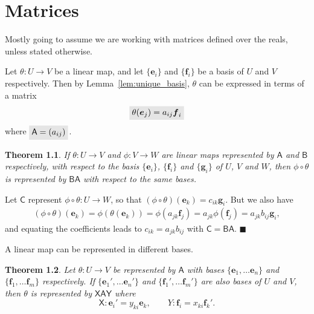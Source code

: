 \documentclass[letter-paper]{tufte-book}
\newtheorem{theorem}{\color{pastel-blue}Theorem}[section]
\newenvironment{proof}[1][Proof]{\begin{trivlist}
\item[\hskip \labelsep {\bfseries #1}]}{\end{trivlist}}
\newcommand{\As}{{\mathsf{A}}}
\newcommand{\Bs}{{\mathsf{B}}}
\newcommand{\Cs}{{\mathsf{C}}}
\newcommand{\Xs}{{\mathsf{X}}}
\newcommand{\Ys}{{\mathsf{Y}}}
\newcommand{\eb}{{\boldsymbol{e}}}
\newcommand{\fb}{{\boldsymbol{f}}}
\newcommand{\qed}{\hfill$\blacksquare$}
\newcommand{\highlight}[1]{\mathchoice%
  {\colorbox{black!10}{$\displaystyle#1$}}%
  {\colorbox{black!10}{$\textstyle#1$}}%
  {\colorbox{black!10}{$\scriptstyle#1$}}%
  {\colorbox{black!10}{$\scriptscriptstyle#1$}}}%
\begin{document}

\chapter{Matrices}

Mostly going to assume we are working with matrices defined over the reals,
unless stated otherwise.

Let $\theta: U \to V$ be a linear map, and let $\{\eb_i\}$ and $\{\fb_i\}$ be a basis of $U$ and $V$ respectively. Then by Lemma~\ref{lem:unique_basis}, $\theta$ can be expressed in terms of a matrix
\begin{equation}
  \highlight{ \theta(\eb_j) = a_{ij} \fb_i }
\end{equation}
where $\highlight{\As = (a_{ij})}$.

\begin{theorem}
  If $\theta : U \to V$ and $\phi: V\to W$ are linear maps represented by $\As$ and $\Bs$ respectively, with respect to the basis $\{\eb_i\}$, $\{\fb_i\}$ and $\{\boldsymbol{g}_i\}$ of $U$, $V$ and $W$, then $\phi \circ \theta$ is represented by $\Bs\As$ with respect to the same bases. 
\end{theorem}

\begin{proof}
  Let $\Cs$ represent $\phi \circ \theta: U \to W$, so that $(\phi\circ\theta)(\eb_k) = c_{ik}\boldsymbol{g}_i$. But we also have
  \begin{align*}
    (\phi\circ\theta)(\eb_k) = \phi(\theta(\eb_k)) = \phi(a_{jk} \fb_j) = a_{jk} \phi(\fb_j) = a_{jk} b_{ij} \boldsymbol{g}_i,
  \end{align*}
  and equating the coefficients leads to $c_{ik} = a_{jk} b_{ij}$ with $\Cs = \Bs \As$. \qed
\end{proof}

A linear map can be represented in different bases.

\begin{theorem}
  Let $\theta: U \to V$ be represented by $\As$ with bases $\{\eb_1, \ldots \eb_n\}$ and $\{\fb_1,\ldots \fb_m\}$ respectively. If $\{\eb_1',\ldots \eb_n'\}$ and $\{\fb_1',\ldots \fb_m'\}$ are also bases of $U$ and $V$, then $\theta$ is represented by $\Xs \As \Ys$ where
  \begin{equation*}
    \Xs:\eb_i' = y_{ki}\eb_k, \qquad Y: \fb_i = x_{ki}\fb_k'.
  \end{equation*}
\end{theorem}
\end{document}
